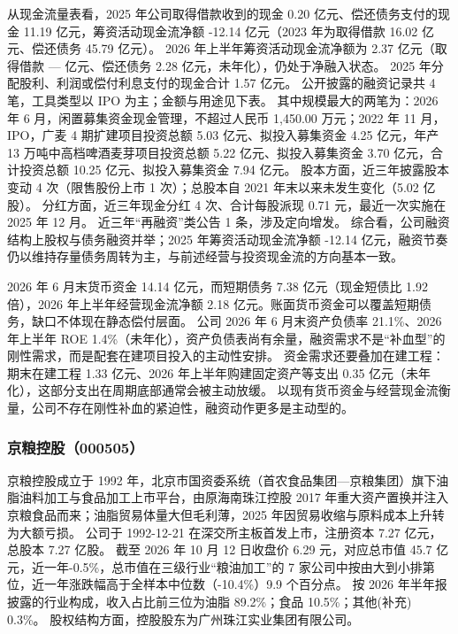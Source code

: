  从现金流量表看，2025 年公司取得借款收到的现金 0.20 亿元、偿还债务支付的现金 11.19 亿元，筹资活动现金流净额 -12.14 亿元（2023 年为取得借款 16.02 亿元、偿还债务 45.79 亿元）。 2026 年上半年筹资活动现金流净额为 2.37 亿元（取得借款 — 亿元、偿还债务 2.28 亿元，未年化），仍处于净融入状态。 2025 年分配股利、利润或偿付利息支付的现金合计 1.57 亿元。 公开披露的融资记录共 4 笔，工具类型以 IPO 为主；金额与用途见下表。 其中规模最大的两笔为：2026 年 6 月，闲置募集资金现金管理，不超过人民币 1,450.00 万元；2022 年 11 月，IPO，广麦 4 期扩建项目投资总额 5.03 亿元、拟投入募集资金 4.25 亿元，年产 13 万吨中高档啤酒麦芽项目投资总额 5.22 亿元、拟投入募集资金 3.70 亿元，合计投资总额 10.25 亿元、拟投入募集资金 7.94 亿元。 股本方面，近三年披露股本变动 4 次（限售股份上市 1 次）；总股本自 2021 年末以来未发生变化（5.02 亿股）。 分红方面，近三年现金分红 4 次、合计每股派现 0.71 元，最近一次实施在 2025 年 12 月。 近三年“再融资”类公告 1 条，涉及定向增发。 综合看，公司融资结构上股权与债务融资并举；2025 年筹资活动现金流净额 -12.14 亿元，融资节奏仍以维持存量债务周转为主，与前述经营与投资现金流的方向基本一致。

 2026 年 6 月末货币资金 14.14 亿元，而短期债务 7.38 亿元（现金短债比 1.92 倍），2026 年上半年经营现金流净额 2.18 亿元。账面货币资金可以覆盖短期债务，缺口不体现在静态偿付层面。 公司 2026 年 6 月末资产负债率 21.1\%、2026 年上半年 ROE 1.4\%（未年化），资产负债表尚有余量，融资需求不是“补血型”的刚性需求，而是配套在建项目投入的主动性安排。 资金需求还要叠加在建工程：期末在建工程 1.33 亿元、2026 年上半年购建固定资产等支出 0.35 亿元（未年化），这部分支出在周期底部通常会被主动放缓。 以现有货币资金与经营现金流衡量，公司不存在刚性补血的紧迫性，融资动作更多是主动型的。




\subsubsection{京粮控股（000505）}
\label{co:000505}

 京粮控股成立于 1992 年，北京市国资委系统（首农食品集团—京粮集团）旗下油脂油料加工与食品加工上市平台，由原海南珠江控股 2017 年重大资产置换并注入京粮食品而来；油脂贸易体量大但毛利薄，2025 年因贸易收缩与原料成本上升转为大额亏损。 公司于 1992-12-21 在深交所主板首发上市，注册资本 7.27 亿元，总股本 7.27 亿股。 截至 2026 年 10 月 12 日收盘价 6.29 元，对应总市值 45.7 亿元，近一年-0.5\%，总市值在三级行业“粮油加工”的 7 家公司中按由大到小排第位，近一年涨跌幅高于全样本中位数（-10.4\%）9.9 个百分点。 按 2026 年半年报披露的行业构成，收入占比前三位为油脂 89.2\%；食品 10.5\%；其他(补充) 0.3\%。 股权结构方面，控股股东为广州珠江实业集团有限公司。

